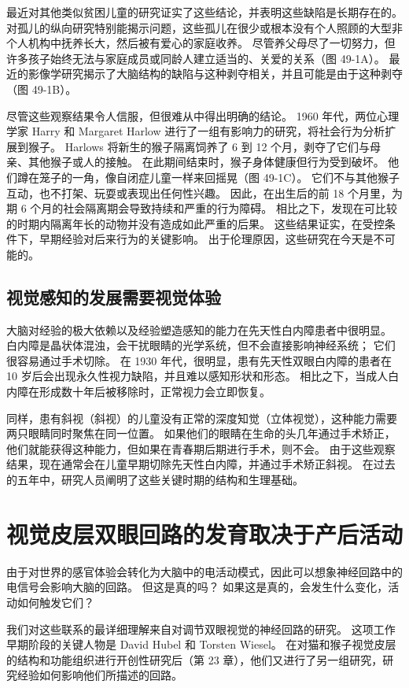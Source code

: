 最近对其他类似贫困儿童的研究证实了这些结论，并表明这些缺陷是长期存在的。 对孤儿的纵向研究特别能揭示问题，这些孤儿在很少或根本没有个人照顾的大型非个人机构中抚养长大，然后被有爱心的家庭收养。 尽管养父母尽了一切努力，但许多孩子始终无法与家庭成员或同龄人建立适当的、关爱的关系（图 49-1A）。 最近的影像学研究揭示了大脑结构的缺陷与这种剥夺相关，并且可能是由于这种剥夺（图 49-1B）。

尽管这些观察结果令人信服，但很难从中得出明确的结论。 1960 年代，两位心理学家 Harry 和 Margaret Harlow 进行了一组有影响力的研究，将社会行为分析扩展到猴子。 Harlows 将新生的猴子隔离饲养了 6 到 12 个月，剥夺了它们与母亲、其他猴子或人的接触。 在此期间结束时，猴子身体健康但行为受到破坏。 他们蹲在笼子的一角，像自闭症儿童一样来回摇晃（图 49-1C）。 它们不与其他猴子互动，也不打架、玩耍或表现出任何性兴趣。 因此，在出生后的前 18 个月里，为期 6 个月的社会隔离期会导致持续和严重的行为障碍。 相比之下，发现在可比较的时期内隔离年长的动物并没有造成如此严重的后果。 这些结果证实，在受控条件下，早期经验对后来行为的关键影响。 出于伦理原因，这些研究在今天是不可能的。

\subsection{视觉感知的发展需要视觉体验}

大脑对经验的极大依赖以及经验塑造感知的能力在先天性白内障患者中很明显。 白内障是晶状体混浊，会干扰眼睛的光学系统，但不会直接影响神经系统； 它们很容易通过手术切除。 在 1930 年代，很明显，患有先天性双眼白内障的患者在 10 岁后会出现永久性视力缺陷，并且难以感知形状和形态。 相比之下，当成人白内障在形成数十年后被移除时，正常视力会立即恢复。

同样，患有斜视（斜视）的儿童没有正常的深度知觉（立体视觉），这种能力需要两只眼睛同时聚焦在同一位置。 如果他们的眼睛在生命的头几年通过手术矫正，他们就能获得这种能力，但如果在青春期后期进行手术，则不会。 由于这些观察结果，现在通常会在儿童早期切除先天性白内障，并通过手术矫正斜视。 在过去的五年中，研究人员阐明了这些关键时期的结构和生理基础。

\section{视觉皮层双眼回路的发育取决于产后活动}
由于对世界的感官体验会转化为大脑中的电活动模式，因此可以想象神经回路中的电信号会影响大脑的回路。 但这是真的吗？ 如果这是真的，会发生什么变化，活动如何触发它们？

我们对这些联系的最详细理解来自对调节双眼视觉的神经回路的研究。 这项工作早期阶段的关键人物是 David Hubel 和 Torsten Wiesel。 在对猫和猴子视觉皮层的结构和功能组织进行开创性研究后（第 23 章），他们又进行了另一组研究，研究经验如何影响他们所描述的回路。

